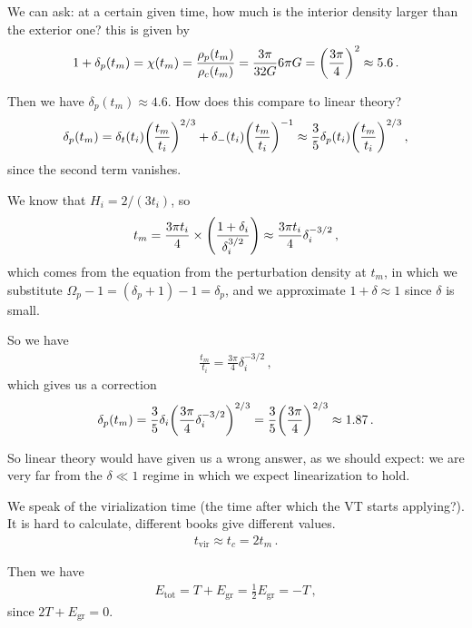 \documentclass[main.tex]{subfiles}
\begin{document}
We can ask: at a certain given time, how much is the interior density larger than the exterior one? this is given by 
%
\begin{align}
1 + \delta_{p}(t_m) = \chi (t_m) = \frac{\rho_{p}(t_m)}{\rho_{c}(t_m)} = \frac{3 \pi }{32 G } 6 \pi G = \qty(\frac{3 \pi }{4})^{2} \approx 5.6 
\,.
\end{align}

Then we have \(\delta_{p}(t_m) \approx 4.6\). 
How does this compare to linear theory? 
%
\begin{align}
\delta_p (t_m) = \delta_{t}(t_i) \qty(\frac{t_m }{t_i})^{2/3} + \delta_{-}(t_i) \qty(\frac{t_m}{t_i})^{-1}
\approx \frac{3}{5} \delta_{p}(t_i) \qty(\frac{t_m}{t_i})^{2/3} 
\,,
\end{align}
%
since the second term vanishes. 

We know that \(H_i = 2/ (3 t_i)\), so 
%
\begin{align}
t_m = \frac{3 \pi t_i}{4} \times \qty(\frac{1 + \delta_{i}}{ \delta_{i}^{3/2}}) \approx \frac{3 \pi t_i}{4} \delta_{i}^{-3/2}
\,,
\end{align}
%
which comes from the equation from the perturbation density at \(t_m\), in which we substitute \(\Omega_{p} - 1 = (\delta_{p} + 1)  - 1 = \delta_{p}\), and we approximate \(1 + \delta \approx 1\) since \(\delta \) is small. 

So we have 
%
\begin{align}
\frac{t_m}{t_i} 
=\frac{3 \pi }{4} \delta_{i}^{-3/2}
\,,
\end{align}
%
which gives us a correction 
%
\begin{align}
\delta_{p}(t_m) =
\frac{3}{5} \delta_{i} \qty( \frac{3 \pi }{4} \delta_{i}^{-3/2})^{2/3}
=\frac{3}{5} \qty(\frac{3 \pi }{4})^{2/3} \approx 1.87
\,.
\end{align}

So linear theory would have given us a wrong answer, as we should expect: we are very far from the \(\delta \ll 1\) regime in which we expect linearization to hold. 

We speak of the virialization time (the time after which the VT starts applying?). It is hard to calculate, different books give different values. 
%
\begin{align}
t _{\text{vir}} \approx t_c = 2 t_m
\,.
\end{align}

Then we have 
%
\begin{align}
E _{\text{tot}} = T + E _{\text{gr}} = \frac{1}{2} E _{\text{gr}} = - T  
\,,
\end{align}
%
since \(2 T + E _{\text{gr}} = 0\).
\end{document}
